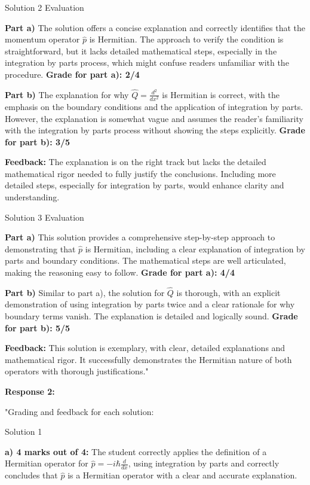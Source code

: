 \documentclass[a4paper,11pt]{article}
\begin{document}
Solution 2 Evaluation

\textbf{Part a)} The solution offers a concise explanation and correctly identifies that the momentum operator \(\hat{p}\) is Hermitian. The approach to verify the condition is straightforward, but it lacks detailed mathematical steps, especially in the integration by parts process, which might confuse readers unfamiliar with the procedure. \textbf{Grade for part a): 2/4}

\textbf{Part b)} The explanation for why \(\hat{Q} = \frac{d^{2}}{dx^{2}}\) is Hermitian is correct, with the emphasis on the boundary conditions and the application of integration by parts. However, the explanation is somewhat vague and assumes the reader's familiarity with the integration by parts process without showing the steps explicitly. \textbf{Grade for part b): 3/5}

\textbf{Feedback:} The explanation is on the right track but lacks the detailed mathematical rigor needed to fully justify the conclusions. Including more detailed steps, especially for integration by parts, would enhance clarity and understanding.

Solution 3 Evaluation

\textbf{Part a)} This solution provides a comprehensive step-by-step approach to demonstrating that \(\hat{p}\) is Hermitian, including a clear explanation of integration by parts and boundary conditions. The mathematical steps are well articulated, making the reasoning easy to follow. \textbf{Grade for part a): 4/4}

\textbf{Part b)} Similar to part a), the solution for \(\hat{Q}\) is thorough, with an explicit demonstration of using integration by parts twice and a clear rationale for why boundary terms vanish. The explanation is detailed and logically sound. \textbf{Grade for part b): 5/5}

\textbf{Feedback:} This solution is exemplary, with clear, detailed explanations and mathematical rigor. It successfully demonstrates the Hermitian nature of both operators with thorough justifications."

\textbf{Response 2:}

"Grading and feedback for each solution:

Solution 1

\textbf{a) 4 marks out of 4:} The student correctly applies the definition of a Hermitian operator for \( \hat{p} = -i\hbar\frac{d}{dx} \), using integration by parts and correctly concludes that \( \hat{p} \) is a Hermitian operator with a clear and accurate explanation.
\end{document}
